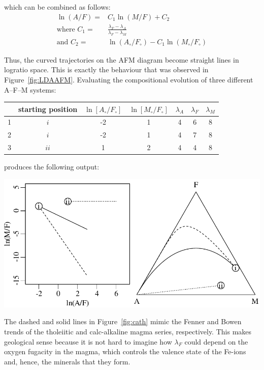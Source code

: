\noindent which can be combined as follows:
\begin{equation}
  \begin{split}
    \ln(A/F) = & C_1 \ln(M/F) + C_2 \\
    \mbox{where~} C_1 = & \frac{\lambda_F-\lambda_A}{\lambda_F-\lambda_M} \\
    \mbox{and~} C_2 = & \ln(A_\circ/F_\circ) - C_1 \ln(M_\circ/F_\circ) 
  \end{split}
\end{equation}

Thus, the curved trajectories on the AFM diagram become straight lines
in logratio space. This is exactly the behaviour that was observed in
Figure~\ref{fig:LDAAFM}. Evaluating the compositional evolution of
three different A--F--M systems:

\begin{center}
\begin{tabular}{c|cccccc}
  & starting position & $\ln[A_\circ/F_\circ]$ & $\ln[M_\circ/F_\circ]$ &
  $\lambda_A$ & $\lambda_F$ & $\lambda_M$ \\ \hline
  1 & $i$ & -2 & 1 & 4 & 6 & 8 \\
  2 & $i$ & -2 & 1 & 4 & 7 & 8 \\
  3 & $ii$ & 1 & 2 & 4 & 4 & 8 \\
\end{tabular}
\end{center}
  
\noindent produces the following output:

\noindent\begin{minipage}[t][][b]{.7\textwidth}
\includegraphics[]{../figures/cath.pdf}\medskip
\end{minipage}
\begin{minipage}[t][][t]{.3\textwidth}
  \label{fig:cath}
\end{minipage}

The dashed and solid lines in Figure~\ref{fig:cath} mimic the Fenner
and Bowen trends of the tholeiitic and calc-alkaline magma series,
respectively. This makes geological sense because it is not hard to
imagine how $\lambda_F$ could depend on the oxygen fugacity in the
magma, which controls the valence state of the Fe-ions and, hence, the
minerals that they form.
